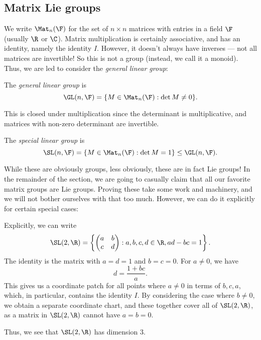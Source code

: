 \documentclass[a4paper]{article}
\begin{document}
\subsection{Matrix Lie groups}
We write $\Mat_n(\F)$ for the set of $n\times n$ matrices with entries in a field $\F$ (usually $\R$ or $\C$). Matrix multiplication is certainly associative, and has an identity, namely the identity $I$. However, it doesn't always have inverses --- not all matrices are invertible! So this is not a group (instead, we call it a monoid). Thus, we are led to consider the \emph{general linear group}:

\begin{defi}
  The \emph{general linear group} is
  \[
    \GL(n, \F) = \{M \in \Mat_n(\F): \det M \not= 0\}.
  \]
\end{defi}
This is closed under multiplication since the determinant is multiplicative, and matrices with non-zero determinant are invertible.

\begin{defi}
  The \emph{special linear group} is
  \[
    \SL(n, \F) = \{M \in \Mat_n(\F): \det M =1\} \leq \GL(n, \F).
  \]
\end{defi}
While these are obviously groups, less obviously, these are in fact Lie groups! In the remainder of the section, we are going to casually claim that all our favorite matrix groups are Lie groups. Proving these take some work and machinery, and we will not bother ourselves with that too much. However, we can do it explicitly for certain special cases:

\begin{eg}
  Explicitly, we can write
  \[
    \SL(2, \R) = \left\{
      \begin{pmatrix}
        a & b\\
        c & d
      \end{pmatrix}:
    a, b, c, d \in \R, ad - bc = 1\right\}.
  \]
  The identity is the matrix with $a = d = 1$ and $b = c = 0$. For $a \not= 0$, we have
  \[
    d = \frac{1 + bc}{a}.
  \]
  This gives us a coordinate patch for all points where $a \not= 0$ in terms of $b, c, a$, which, in particular, contains the identity $I$. By considering the case where $b \not= 0$, we obtain a separate coordinate chart, and these together cover all of $\SL(2, \R)$, as a matrix in $\SL(2, \R)$ cannot have $a = b = 0$.

  Thus, we see that $\SL(2, \R)$ has dimension $3$.
\end{eg}
\end{document}

